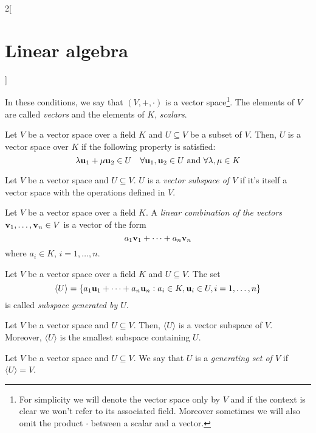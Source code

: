 \documentclass[../../../main.tex]{subfiles}
\begin{document}
\begin{multicols}{2}[\section{Linear algebra}]
\begin{definition}
\begin{enumerate}
    \end{enumerate}
    In these conditions, we say that $(V,+,\cdot)$ is a vector space\footnote{For simplicity we will denote the vector space only by $V$ and if the context is clear we won't refer to its associated field. Moreover sometimes we will also omit the product $\cdot$ between a scalar and a vector.}. The elements of $V$ are called \textit{vectors} and the elements of $K$, \textit{scalars}.
  \end{definition}
  \begin{definition}
    Let $V$ be a vector space over a field $K$ and $U\subseteq V$ be a subset of $V$. Then, $U$ is a vector space over $K$ if the following property is satisfied:
    $$\lambda \boldsymbol{\mathrm{u}}_1+\mu \boldsymbol{\mathrm{u}}_2\in U\quad\forall \boldsymbol{\mathrm{u}}_1,\boldsymbol{\mathrm{u}}_2\in U\text{ and }\forall\lambda,\mu\in K$$
  \end{definition}
  \begin{definition}
    Let $V$ be a vector space and $U\subseteq V$. $U$ is a \textit{vector subspace of $V$} if it's itself a vector space with the operations defined in $V$.
  \end{definition}
  \begin{definition}
    Let $V$ be a vector space over a field $K$. A \textit{linear combination of the vectors $\boldsymbol{\mathrm{v}}_1,\ldots,\boldsymbol{\mathrm{v}}_n\in V$} is a vector of the form $$a_1\boldsymbol{\mathrm{v}}_1+\cdots+a_n\boldsymbol{\mathrm{v}}_n$$ where $a_i\in K$, $i=1,\ldots,n$.
  \end{definition}
  \begin{definition}
    Let $V$ be a vector space over a field $K$ and $U\subseteq V$. The set $$\langle U\rangle=\{a_1\boldsymbol{\mathrm{u}}_1+\cdots+a_n\boldsymbol{\mathrm{u}}_n:a_i\in K,\boldsymbol{\mathrm{u}}_i\in U,i=1,\ldots,n\}$$ is called \textit{subspace generated by $U$}.
  \end{definition}
  \begin{lemma}
    Let $V$ be a vector space and $U\subseteq V$. Then, $\langle U\rangle$ is a vector subspace of $V$. Moreover, $\langle U\rangle$ is the smallest subspace containing $U$.
  \end{lemma}
  \begin{definition}
    Let $V$ be a vector space and $U\subseteq V$. We say that $U$ is a \textit{generating set of $V$} if $\langle U\rangle=V$.
  \end{definition}

\end{multicols}
\end{document}
